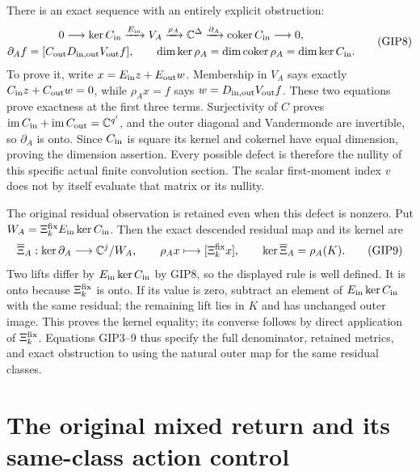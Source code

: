 \documentclass[11pt,a4paper]{article}
\begin{document}
There is an exact sequence with an entirely explicit obstruction:
\[
 \begin{gathered}
 0\longrightarrow\ker C_{\rm in}
   \xrightarrow{E_{\rm in}}V_A
   \xrightarrow{\rho_A}\mathbb C^\Delta
   \xrightarrow{\partial_A}\operatorname{coker}C_{\rm in}
   \longrightarrow0,\\
 \partial_A f=[C_{\rm out}D_{\rm in,out}V_{\rm out}f],\qquad
 \dim\ker\rho_A=\dim\operatorname{coker}\rho_A
                           =\dim\ker C_{\rm in}.
 \end{gathered}\tag{GIP8}
\]
To prove it, write $x=E_{\rm in}z+E_{\rm out}w$.
Membership in $V_A$ says exactly $C_{\rm in}z+C_{\rm out}w=0$,
while $\rho_Ax=f$ says $w=D_{\rm in,out}V_{\rm out}f$.
These two equations prove exactness at the first three terms.
Surjectivity of $C$ proves
$\operatorname{im}C_{\rm in}+\operatorname{im}C_{\rm out}
=\mathbb C^{q'}$, and the outer diagonal and Vandermonde are
invertible, so $\partial_A$ is onto. Since $C_{\rm in}$ is
square its kernel and cokernel have equal dimension, proving the
dimension assertion. Every possible defect is therefore the
nullity of this specific actual finite convolution section.
The scalar first-moment index $v$ does not by itself evaluate
that matrix or its nullity.

The original residual observation is retained even when this defect
is nonzero. Put $W_A=\Xi_k^{\rm fix}E_{\rm in}\ker C_{\rm in}$.
Then the exact descended residual map and its kernel are
\[
 \overline\Xi_A:\ker\partial_A\longrightarrow\mathbb C^j/W_A,
 \qquad \rho_Ax\longmapsto[\Xi_k^{\rm fix}x],\qquad
 \ker\overline\Xi_A=\rho_A(K).
 \tag{GIP9}
\]
Two lifts differ by $E_{\rm in}\ker C_{\rm in}$ by GIP8,
so the displayed rule is well defined. It is onto because
$\Xi_k^{\rm fix}$ is onto. If its value is zero, subtract an
element of $E_{\rm in}\ker C_{\rm in}$ with the same residual;
the remaining lift lies in $K$ and has unchanged outer image.
This proves the kernel equality; its converse follows by direct
application of $\Xi_k^{\rm fix}$. Equations GIP3--9 thus specify
the full denominator, retained metrics, and exact obstruction to
using the natural outer map for the same residual classes.


\clearpage
\section{The original mixed return and its same-class action control}
\label{sec:MCE}
\end{document}
